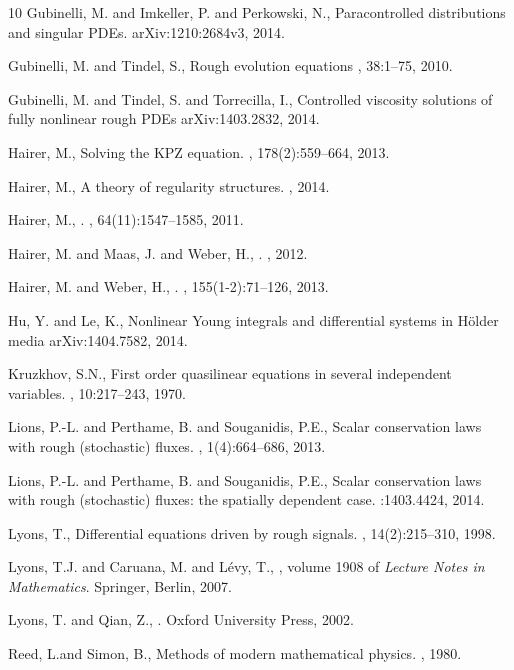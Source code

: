 \documentclass[11pt,a4paper]{amsart}
\theoremstyle{plain}%
\theoremstyle{definition}
\theoremstyle{remark}
\numberwithin{equation}{section} %
\begin{document}
\begin{thebibliography}{10}
Gubinelli, M. and Imkeller, P. and Perkowski, N.,
\newblock Paracontrolled distributions and singular {PDE}s.
\newblock arXiv:1210:2684v3, 2014.

Gubinelli, M. and Tindel, S.,
\newblock Rough evolution equations
,  38:1--75, 2010.

Gubinelli, M. and Tindel, S. and Torrecilla, I.,
\newblock Controlled viscosity solutions of fully nonlinear rough {PDE}s
\newblock arXiv:1403.2832, 2014.

Hairer, M.,
\newblock Solving the KPZ equation.
, 178(2):559--664, 2013.

Hairer, M.,
\newblock A theory of regularity structures.
, 2014.


 Hairer, M.,
.
, 64(11):1547--1585, 2011.

 Hairer, M. and   Maas, J. and  Weber, H.,
.
, 2012.

 Hairer, M. and  Weber, H.,
.
, 155(1-2):71--126, 2013.

 Hu, Y. and Le, K.,
 \newblock Nonlinear Young integrals and differential systems in H\"older media
 \newblock arXiv:1404.7582, 2014.
 
Kruzkhov, S.N.,
\newblock First order quasilinear equations in several independent variables.
, 10:217--243, 1970.

Lions, P.-L. and Perthame, B. and Souganidis, P.E.,
\newblock Scalar conservation laws with rough (stochastic) fluxes.
, 1(4):664--686, 2013.

Lions, P.-L. and Perthame, B. and Souganidis, P.E.,
\newblock Scalar conservation laws with rough (stochastic) fluxes: the spatially dependent case.
:1403.4424, 2014.

Lyons, T.,  
\newblock Differential equations driven by rough signals.
, 14(2):215--310, 1998. 

Lyons, T.J. and Caruana, M. and  L{\'e}vy, T.,
, volume 1908 of
  {\em {Lecture Notes in Mathematics}}.
\newblock Springer, Berlin, 2007.

Lyons, T. and  Qian, Z.,
.
\newblock Oxford University Press, 2002.

Reed, L.and Simon, B.,
\newblock Methods of modern mathematical physics.
, 1980.

\end{thebibliography}
\end{document}
